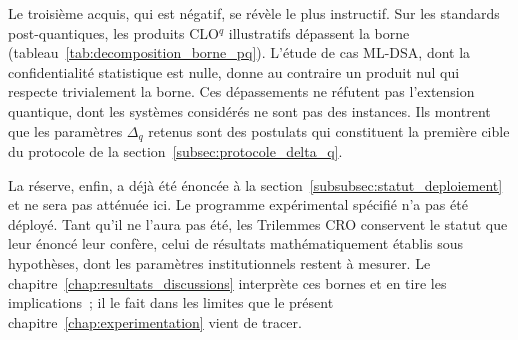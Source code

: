 \begin{sloppypar}
Le troisi\`eme acquis, qui est n\'egatif, se r\'ev\`ele le plus instructif. Sur les
standards post-quantiques, les produits CLO$^q$ illustratifs d\'epassent la borne
(tableau~\ref{tab:decomposition_borne_pq}). L'\'etude de cas ML-DSA, dont la confidentialit\'e
statistique est nulle, donne au contraire un produit nul qui respecte trivialement la
borne. Ces d\'epassements ne r\'efutent pas l'extension quantique, dont les
syst\`emes consid\'er\'es ne sont pas des instances. Ils montrent que les
param\`etres $\Delta_q$ retenus sont des postulats qui constituent la premi\`ere
cible du protocole de la section~\ref{subsec:protocole_delta_q}.

La r\'eserve, enfin, a d\'ej\`a \'et\'e \'enonc\'ee \`a la
section~\ref{subsubsec:statut_deploiement} et ne sera pas att\'enu\'ee ici.
Le programme exp\'erimental sp\'ecifi\'e n'a pas \'et\'e d\'eploy\'e.
Tant qu'il ne l'aura pas \'et\'e, les Trilemmes CRO conservent le
statut que leur \'enonc\'e leur conf\`ere, celui de r\'esultats math\'ematiquement
\'etablis sous hypoth\`eses, dont les param\`etres institutionnels restent \`a
mesurer. Le
chapitre~\ref{chap:resultats_discussions} interpr\`ete ces bornes et en tire
les implications~; il le fait dans les limites que le pr\'esent
chapitre~\ref{chap:experimentation} vient de tracer.

\end{sloppypar}